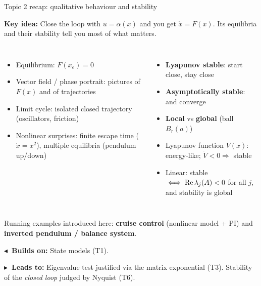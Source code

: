 \documentclass[10pt]{beamer-control}
\newcommand\LINKS[2]{%
  \par\vfill
  {\scriptsize\setlength\fboxsep{3pt}%
  \colorbox{AUHighlight!10}{\parbox{\dimexpr\linewidth-6pt\relax}{%
    \textbf{\color{AUHighlight}$\blacktriangleleft$~Builds on:} #1\par
    \textbf{\color{AUHighlight}$\blacktriangleright$~Leads to:} #2%
    \hfill\hyperlink{coursemap}{\beamerbutton{Course map}}}}}%
}
\newcommand\KEYIDEA[1]{%
  {\setlength\fboxsep{4pt}%
  \colorbox{NorthTce!12}{\parbox{\dimexpr\linewidth-8pt\relax}{\small\textbf{Key idea:} #1}}}\par\smallskip
}
\begin{document}
\begin{frame}[label=topic2]{Topic 2 recap: qualitative behaviour and stability}
  \KEYIDEA{Close the loop with $u=\alpha(x)$ and you get $\dot x = F(x)$. Its equilibria and their stability tell you most of what matters.}
  \begin{columns}[t]
    \footnotesize
    \begin{itemize}
      \item Equilibrium: $F(x_e) = 0$
      \item Vector field / phase portrait: pictures of $F(x)$ and of trajectories
      \item Limit cycle: isolated closed trajectory (oscillators, friction)
      \item Nonlinear surprises: finite escape time ($\dot x = x^2$), multiple equilibria (pendulum up/down)
    \end{itemize}
    \footnotesize
    \begin{itemize}
      \item \textbf{Lyapunov stable}: start close, stay close
      \item \textbf{Asymptotically stable}: and converge
      \item \textbf{Local} vs \textbf{global} (ball $B_r(a)$)
      \item Lyapunov function $V(x)$: energy-like; $\dot V<0 \Rightarrow$ stable
      \item \alert{Linear: stable $\iff \operatorname{Re}\lambda_j(A)<0$ for all $j$}, and stability is global
    \end{itemize}
  \end{columns}
  \smallskip
  \footnotesize Running examples introduced here: \textbf{cruise control} (nonlinear model + PI) and \textbf{inverted pendulum / balance system}.
  \LINKS{State models (T1).}{Eigenvalue test justified via the matrix exponential (T3). Stability of the \emph{closed loop} judged by Nyquist (T6).}
\end{frame}

\end{document}
